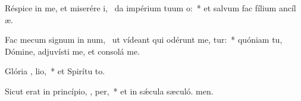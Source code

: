 \item Réspice in me, et miserére i,~\pscross{} da impérium tuum  o:~* et salvum fac fílium ancíl æ.
\item Fac mecum signum in num,~\pscross{} ut vídeant qui odérunt me,  tur:~* quóniam tu, Dómine, adjuvísti me, et consolá  me.
\item Glória ,  lio,~* et Spirítu to.
\item Sicut erat in princípio,  ,  per,~* et in sǽcula sæculó. men.
